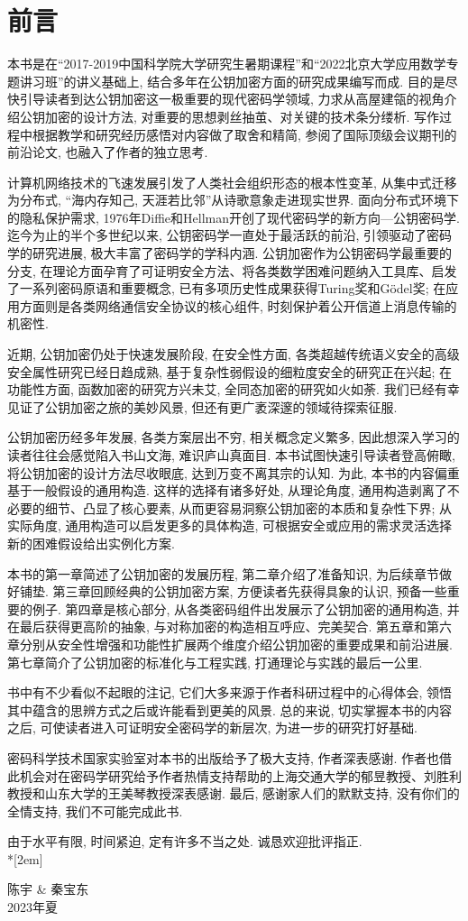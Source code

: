 \chapter{前言}
本书是在``2017-2019中国科学院大学研究生暑期课程''和``2022北京大学应用数学专题讲习班''的讲义基础上, 结合多年在公钥加密方面的研究成果编写而成. 
目的是尽快引导读者到达公钥加密这一极重要的现代密码学领域, 力求从高屋建瓴的视角介绍公钥加密的设计方法, 对重要的思想剥丝抽茧、对关键的技术条分缕析. 
写作过程中根据教学和研究经历感悟对内容做了取舍和精简, 参阅了国际顶级会议期刊的前沿论文, 也融入了作者的独立思考.   

计算机网络技术的飞速发展引发了人类社会组织形态的根本性变革, 从集中式迁移为分布式, ``海内存知己, 天涯若比邻''从诗歌意象走进现实世界. 
面向分布式环境下的隐私保护需求, 1976年Diffie和Hellman开创了现代密码学的新方向—公钥密码学. 
迄今为止的半个多世纪以来, 公钥密码学一直处于最活跃的前沿, 引领驱动了密码学的研究进展, 极大丰富了密码学的学科内涵. 
公钥加密作为公钥密码学最重要的分支, 在理论方面孕育了可证明安全方法、将各类数学困难问题纳入工具库、启发了一系列密码原语和重要概念, 
已有多项历史性成果获得Turing奖和G\"odel奖; 在应用方面则是各类网络通信安全协议的核心组件, 时刻保护着公开信道上消息传输的机密性. 

近期, 公钥加密仍处于快速发展阶段, 在安全性方面, 各类超越传统语义安全的高级安全属性研究已经日趋成熟, 基于复杂性弱假设的细粒度安全的研究正在兴起; 
在功能性方面, 函数加密的研究方兴未艾, 全同态加密的研究如火如荼. 我们已经有幸见证了公钥加密之旅的美妙风景, 但还有更广袤深邃的领域待探索征服. 

公钥加密历经多年发展, 各类方案层出不穷, 相关概念定义繁多, 因此想深入学习的读者往往会感觉陷入书山文海, 难识庐山真面目. 
本书试图快速引导读者登高俯瞰, 将公钥加密的设计方法尽收眼底, 达到万变不离其宗的认知. 
为此, 本书的内容偏重基于一般假设的通用构造. 这样的选择有诸多好处, 从理论角度, 通用构造剥离了不必要的细节、凸显了核心要素, 从而更容易洞察公钥加密的本质和复杂性下界; 
从实际角度, 通用构造可以启发更多的具体构造, 可根据安全或应用的需求灵活选择新的困难假设给出实例化方案. 

本书的第一章简述了公钥加密的发展历程, 第二章介绍了准备知识, 为后续章节做好铺垫. 
第三章回顾经典的公钥加密方案, 方便读者先获得具象的认识, 预备一些重要的例子. 
第四章是核心部分, 从各类密码组件出发展示了公钥加密的通用构造, 并在最后获得更高阶的抽象, 与对称加密的构造相互呼应、完美契合. 
第五章和第六章分别从安全性增强和功能性扩展两个维度介绍公钥加密的重要成果和前沿进展. 
第七章简介了公钥加密的标准化与工程实践, 打通理论与实践的最后一公里. 

书中有不少看似不起眼的注记, 它们大多来源于作者科研过程中的心得体会, 领悟其中蕴含的思辨方式之后或许能看到更美的风景. 
总的来说, 切实掌握本书的内容之后, 可使读者进入可证明安全密码学的新层次, 为进一步的研究打好基础. 

密码科学技术国家实验室对本书的出版给予了极大支持, 作者深表感谢. 
作者也借此机会对在密码学研究给予作者热情支持帮助的上海交通大学的郁昱教授、刘胜利教授和山东大学的王美琴教授深表感谢. 
最后, 感谢家人们的默默支持, 没有你们的全情支持, 我们不可能完成此书.   

由于水平有限, 时间紧迫, 定有许多不当之处. 诚恳欢迎批评指正. \\*[2em]

\hfill 陈宇 \& 秦宝东 \\

\hfill 2023年夏  